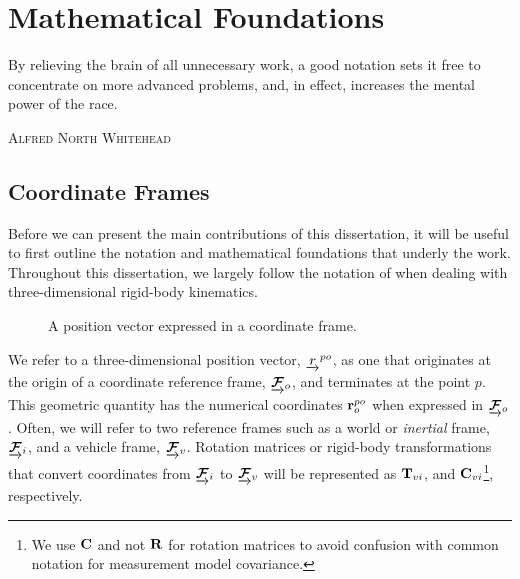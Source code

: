 \chapter{Mathematical Foundations}
\label{ch:math}
\epigraph{By relieving the brain of all unnecessary work, a good notation sets it free to concentrate on more advanced problems, and, in effect, increases the mental power of the race.}{\textsc{Alfred North Whitehead}}
  \section{Coordinate Frames}

Before we can present the main contributions of this dissertation, it will be useful to first outline the notation and mathematical foundations that underly the work. Throughout this dissertation, we largely follow the notation of \cite{Barfoot2017-ri} when dealing with three-dimensional rigid-body kinematics. 

\begin{figure}[h!]
\center
{}
%
%
\caption{A position vector expressed in a coordinate frame.}
\end{figure}

We refer to a three-dimensional position vector, $\underrightarrow{r}^{po}$, as one that originates at the origin of a coordinate reference frame, $\underrightarrow{ \boldsymbol{\mathbf{\mathcal{F}}} }_{o}$, and terminates at the point $p$. This geometric quantity has the numerical coordinates $\boldsymbol{\mathbf{r}}^{po}_o$ when expressed in $\underrightarrow{ \boldsymbol{\mathbf{\mathcal{F}}} }_{o}$. Often, we will refer to two reference frames such as a world or \textit{inertial} frame,  $\underrightarrow{ \boldsymbol{\mathbf{\mathcal{F}}} }_{i}$, and a vehicle frame, $\underrightarrow{ \boldsymbol{\mathbf{\mathcal{F}}} }_{v}$. Rotation matrices or rigid-body transformations that convert coordinates from $\underrightarrow{ \boldsymbol{\mathbf{\mathcal{F}}} }_{i}$ to $\underrightarrow{ \boldsymbol{\mathbf{\mathcal{F}}} }_{v}$ will be represented as $\boldsymbol{\mathbf{T}}_{vi}$, and $\boldsymbol{\mathbf{C}}_{vi}$\footnote{We use $\boldsymbol{\mathbf{C}}$ and not $\boldsymbol{\mathbf{R}}$ for rotation matrices to avoid confusion with common notation for measurement model covariance.}, respectively. 


